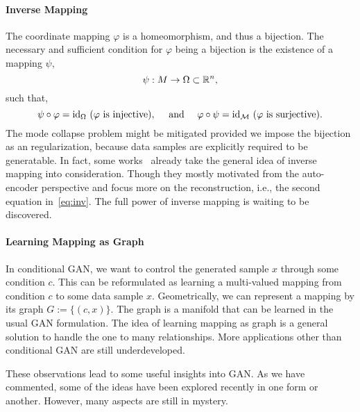 \paragraph{Inverse Mapping}
The coordinate mapping $\varphi$ is a homeomorphism,
and thus a bijection.
The necessary and sufficient condition for $\varphi$ being a bijection is
the existence of a mapping $\psi$,
\begin{equation}
    \psi:M\to \Omega\subset{\mathbb{R}}^n,
\end{equation}
such that,
\begin{equation}\label{eq:inv}
    \psi\circ\varphi = {\mathop{\mathrm{id}}}_\Omega ~
    (\varphi\text{ is injective}), \quad\text{ and } \quad
    \varphi\circ\psi = {\mathop{\mathrm{id}}}_{\mathcal{M}} ~
    (\varphi\text{ is surjective}).
\end{equation}
The mode collapse problem might be mitigated
provided we impose the bijection as an regularization,
because data samples are explicitly required to be generatable.
In fact,
some works~\cite{huang2016stacked,che2016mode,kim2017learning,
perarnau2016invertible,zhu2016generative}
already take the general idea of inverse mapping into consideration.
Though they mostly motivated from the auto-encoder perspective
and focus more on the reconstruction,
i.e., the second equation in~\eqref{eq:inv}.
The full power of inverse mapping is waiting to be discovered.

\paragraph{Learning Mapping as Graph}
In conditional GAN,
we want to control the generated sample $x$ through some condition $c$.
This can be reformulated as learning a multi-valued mapping
from condition $c$ to some data sample $x$.
Geometrically,
we can represent a mapping by its graph $G:=\{(c,x)\}$.
The graph is a manifold that can be learned in the usual GAN formulation.
The idea of learning mapping as graph is a general solution to
handle the one to many relationships.
More applications other than conditional GAN are still underdeveloped.

These observations lead to some useful insights into GAN.
As we have commented,
some of the ideas have been explored recently
in one form or another.
However,
many aspects are still in mystery.

